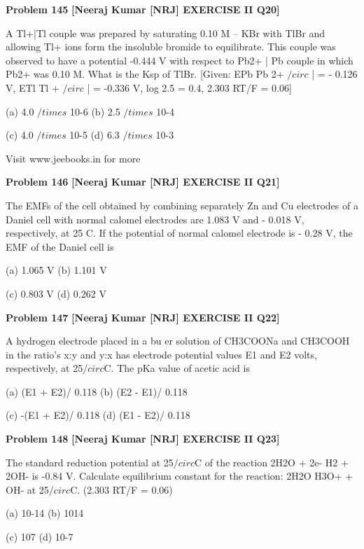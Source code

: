 \begin{problembox}
\textbf{Problem 145} \hfill \textbf{[Neeraj Kumar [NRJ] EXERCISE II Q20]}
\label{q:ext-nrj_all_questions-145}

A Tl+|Tl couple was prepared by saturating 
0.10 M -- KBr with TlBr and  allowing Tl+ ions 
form the insoluble bromide to equilibrate. This 
couple was observed to have a potential -0.444 
V with respect to Pb2+ | Pb couple in which 
Pb2+ was 0.10 M. What is the Ksp of TlBr. 
[Given: EPb
Pb
2+
$/circ$
|
  = - 0.126 V, ETl
Tl
+
$/circ$
|
 = -0.336 V, 
log 2.5 = 0.4, 2.303 RT/F = 0.06]
 
 (a) 4.0 $/times$ 10-6 
(b) 2.5 $/times$ 10-4
 
 (c) 4.0 $/times$ 10-5 
(d) 6.3 $/times$ 10-3
 
 
Visit www.jeebooks.in for more
\end{problembox}

\begin{problembox}
\textbf{Problem 146} \hfill \textbf{[Neeraj Kumar [NRJ] EXERCISE II Q21]}
\label{q:ext-nrj_all_questions-146}

The EMFs of the cell obtained by combining 
separately Zn and Cu electrodes of a Daniel cell 
with normal calomel  electrodes are 1.083 V and 
- 0.018 V, respectively, at 25  C. If the potential of 
normal calomel electrode is - 0.28 V, the EMF of 
the Daniel cell is
 
 (a) 1.065 V 
(b) 1.101 V
 
 (c) 0.803 V 
(d) 0.262 V
\end{problembox}

\begin{problembox}
\textbf{Problem 147} \hfill \textbf{[Neeraj Kumar [NRJ] EXERCISE II Q22]}
\label{q:ext-nrj_all_questions-147}

A hydrogen electrode placed in a bu  er solution 
of CH3COONa and CH3COOH in the ratio's x:y 
and y:x has electrode potential values E1 and E2 
volts,  respectively, at 25$/circ$C. The pKa value of acetic 
acid is
 
 (a) (E1 + E2)/ 0.118 
(b) (E2 - E1)/ 0.118
 
 (c) -(E1 + E2)/ 0.118 
(d) (E1 - E2)/ 0.118
\end{problembox}

\begin{problembox}
\textbf{Problem 148} \hfill \textbf{[Neeraj Kumar [NRJ] EXERCISE II Q23]}
\label{q:ext-nrj_all_questions-148}

The standard reduction potential at 25$/circ$C of the 
reaction 2H2O + 2e-   H2 + 2OH- is -0.84 V. 
Calculate equilibrium constant for the reaction: 
2H2O   H3O+ + OH- at 25$/circ$C. (2.303 RT/F = 0.06)
 
 (a) 10-14 
(b) 1014
 
 (c) 107 
(d) 10-7
\end{problembox}

